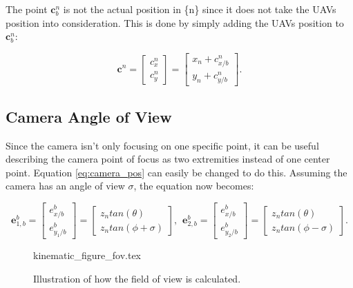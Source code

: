 The point $\bm{c}_b^n$ is not the actual position in \{n\} since it does not take the UAVs position into consideration. This is done by simply adding the UAVs position to $\bm{c}_b^n$:

\begin{equation} \label{eq:body_ned_trans}
	\bm{c}^n =
	\begin{bmatrix}
		c_x^n \\ c_y^n
	\end{bmatrix}
	=
	\begin{bmatrix}
		x_n + c_{x/b}^n \\
		y_n + c_{y/b}^n
	\end{bmatrix}.
\end{equation}

\subsection{Camera Angle of View}
Since the camera isn't only focusing on one specific point, it can be useful describing the camera point of focus as two extremities instead of one center point. Equation \eqref{eq:camera_pos} can easily be changed to do this. Assuming the camera has an angle of view $\sigma$, the equation now becomes:

\begin{equation}
	\bm{e}_{1,b}^b = 
	\begin{bmatrix}
		e^b_{x/b} \\ e^b_{y_1/b}
	\end{bmatrix}
	=
	\begin{bmatrix}
		z_n tan(\theta)\\
		z_n tan(\phi + \sigma)
	\end{bmatrix}
	, \hspace{5pt}
	\bm{e}_{2,b}^b = 
	\begin{bmatrix}
		e^b_{x/b} \\ e^b_{y_2/b}
	\end{bmatrix}
	=
	\begin{bmatrix}
		z_n tan(\theta)\\
		z_n tan(\phi - \sigma)
	\end{bmatrix}.
\end{equation}

\begin{figure}
	{kinematic_figure_fov.tex}
	\caption{Illustration of how the field of view is calculated.}
	\label{fig:camera_kinematics_fov}
\end{figure}

